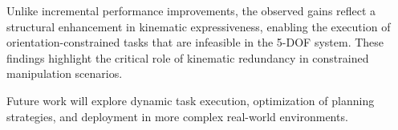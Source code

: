 \documentclass[conference]{IEEEtran}
\begin{document}
	Unlike incremental performance improvements, the observed gains reflect a structural enhancement in kinematic expressiveness, enabling the execution of orientation-constrained tasks that are infeasible in the 5-DOF system. These findings highlight the critical role of kinematic redundancy in constrained manipulation scenarios.
	
	Future work will explore dynamic task execution, optimization of planning strategies, and deployment in more complex real-world environments.
	
	


	
\end{document}
